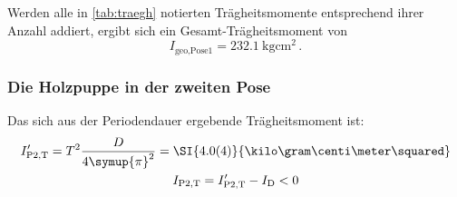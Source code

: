 Werden alle in \ref{tab:traegh} notierten Trägheitsmomente entsprechend ihrer Anzahl addiert, ergibt sich ein 
Gesamt-Trägheitsmoment von 
\begin{equation}
    I_\text{geo,Pose1}=\SI{232.1}{\kilo\gram\centi\meter\squared}\,.
\end{equation}


\FloatBarrier
\subsubsection{Die Holzpuppe in der zweiten Pose}

Das sich aus der Periodendauer ergebende Trägheitsmoment ist: 
\begin{gather}
    I'_\text{P2,T}=T^2\frac{D}{4\symup{\pi}^2}=\SI{4.0(4)}{\kilo\gram\centi\meter\squared} \\
    I_\text{P2,T}=I'_\text{P2,T}-I_\text{D} <0 
\end{gather}